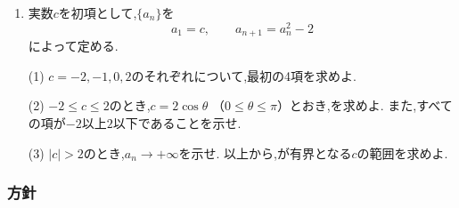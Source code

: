 \begin{enumerate}[label=\textbf{問\arabic*.},leftmargin=3.8em,format=\bookitemlink{practice-special}{problem}{hint}]
  \item 実数$c$を初項として,$\{a_n\}$を
    \[
      a_1=c,\qquad a_{n+1}=a_n^2-2
    \]
    によって定める.
    \par\smallskip\noindent
    (1) $c=-2,-1,0,2$のそれぞれについて,最初の4項を求めよ.
    \par\smallskip\noindent
    (2) $-2\le c\le2$のとき,$c=2\cos\theta$
    （$0\le\theta\le\pi$）とおき,を求めよ.
    また,すべての項が$-2$以上$2$以下であることを示せ.
    \par\smallskip\noindent
    (3) $|c|>2$のとき,$a_n\to+\infty$を示せ.
    以上から,が有界となる$c$の範囲を求めよ.
\end{enumerate}

\subsubsection{方針}\label{節：発展・特殊型：方針}
